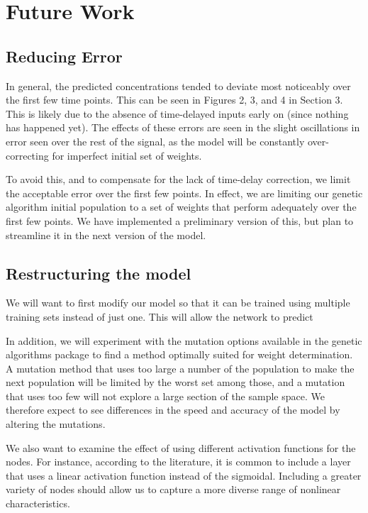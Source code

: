\documentclass[10pt]{article}
\begin{document}
\section{Future Work}

\subsection{Reducing Error}
%
In general, the predicted concentrations tended to deviate most noticeably over the first few time points. This can be seen in Figures 2, 3, and 4 in Section 3. This is likely due to the absence of time-delayed inputs early on (since nothing has happened yet). The effects of these errors are seen in the slight oscillations in error seen over the rest of the signal, as the model will be constantly over-correcting for imperfect initial set of weights.

To avoid this, and to compensate for the lack of time-delay correction, we limit the acceptable error over the first few points. In effect, we are limiting our genetic algorithm initial population to a set of weights that perform adequately over the first few points. We have implemented a preliminary version of this, but plan to streamline it in the next version of the model.

\subsection{Restructuring the model}
We will want to first modify our model so that it can be trained using multiple training sets instead of just one. This will allow the network to predict 

In addition, we will experiment with the mutation options available in the genetic algorithms package to find a method optimally suited for weight determination. A mutation method that uses too large a number of the population to make the next population will be limited by the worst set among those, and a mutation that uses too few will not explore a large section of the sample space. We therefore expect to see differences in the speed and accuracy of the model by altering the mutations.

We also want to examine the effect of using different activation functions for the nodes. For instance, according to the literature, it is common to include a layer that uses a linear activation function instead of the sigmoidal. Including a greater variety of nodes should allow us to capture a more diverse range of nonlinear characteristics.
\end{document}
